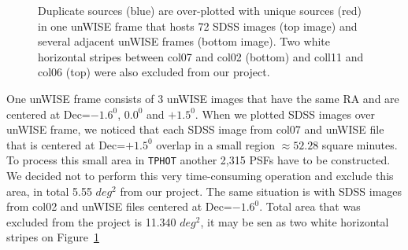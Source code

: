 \begin{figure}[!ht]
\caption{Duplicate sources (blue) are over-plotted with unique sources (red) in one unWISE frame that hosts 72 SDSS images (top image) and several adjacent unWISE frames (bottom image). Two white horizontal stripes between col07 and col02 (bottom) and coll11 and col06 (top) were also excluded from our project.}
\label{fig:duplicate}
\end{figure}

One unWISE frame consists of 3 unWISE images that have the same RA and are centered at Dec=$-1.6^{0}$, $0.0^{0}$ and $+1.5^{0}$. When we plotted SDSS images over unWISE frame, we noticed that each SDSS image from col07 and unWISE file that is centered at Dec=$+1.5^{0}$ overlap in a small region $\approx52.28$ square minutes. To process this small area in {\tt TPHOT} another 2,315 PSFs have to be constructed. We decided not to perform this very time-consuming operation and exclude this area, in total 5.55 $deg^{2}$ from our project. The same situation is with SDSS images from col02 and unWISE files centered at Dec=$-1.6^{0}$. Total area that was excluded from the project is 11.340 $deg^{2}$, it may be sen as two white horizontal stripes on Figure~\ref{fig:duplicate}

